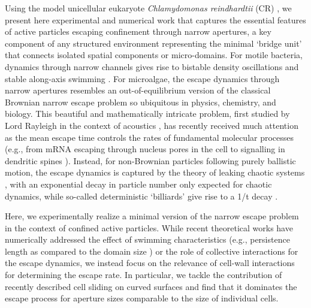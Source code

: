 \documentclass[aps,showpacs,superscriptaddress,amsfonts,twocolumn,prl]{revtex4}
\begin{document}
Using the model unicellular eukaryote \textit{Chlamydomonas reindhardtii} (CR) \cite{Harris2001, Harris2009a, Goldstein2015}, we present here experimental and numerical work that captures the essential features of active particles escaping confinement through narrow apertures, a key component of any structured environment representing the minimal `bridge unit' that connects isolated spatial components or micro-domains. For motile bacteria, dynamics through narrow channels gives rise to bistable density oscillations and stable along-axis swimming \cite{Paoluzzi2015,Vizsnyiczai2020}. For microalgae, the escape dynamics through narrow apertures resembles an out-of-equilibrium version of the classical Brownian narrow escape problem so ubiquitous in physics, chemistry, and biology. This beautiful and mathematically intricate problem, first studied by Lord Rayleigh in the context of acoustics \cite{Rayleigh1878}, has  recently received much attention as the mean escape time controls the rates of fundamental molecular processes (e.g., from mRNA escaping through nucleus pores in the cell \cite{Berg1981} to signalling in dendritic spines \cite{Harris1988, Holcman2005}). Instead, for non-Brownian particles following purely ballistic motion, the escape dynamics is captured by the theory of leaking chaotic systems \cite{Altmann2013}, with an exponential decay in particle number only expected for chaotic dynamics, while so-called deterministic `billiards' give rise to a 1/t decay \cite{Bauer1990, Krieger2016, Spagnolie2017}. 

Here, we experimentally realize a minimal version of the narrow escape problem in the context of confined active particles. While recent theoretical works have numerically addressed the effect of swimming characteristics (e.g., persistence length as compared to the domain size \cite{Caprini2019, Paoluzzi2020}) or the role of collective interactions \cite{Olsen2020} for the escape dynamics, we instead focus on the relevance of cell-wall interactions for determining the escape rate. In particular, we tackle the contribution of  recently described cell sliding on curved surfaces \cite{Contino2015, Sipos2015, Ostapenko2018, Thery2021, Cammann2021} and find that it dominates the escape process for aperture sizes comparable to the size of individual cells.
\end{document}
